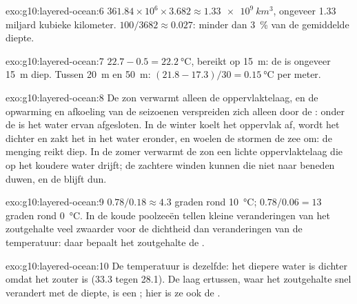 \begin{solution}{exo:g10:layered-ocean:6}
$361.84\times10^6 \times 3.682 \approx \qty{1.33e9}{km^3}$, ongeveer
\num{1.33} miljard kubieke kilometer. $100/3682 \approx 0.027$: minder dan
\qty{3}{\percent} van de gemiddelde diepte.
\end{solution}

\begin{solution}{exo:g10:layered-ocean:7}
$22.7 - 0.5 = \qty{22.2}{\degreeCelsius}$, bereikt op \qty{15}{m}: de  is ongeveer \qty{15}{m} diep. Tussen \qty{20}{m} en \qty{50}{m}:
$(21.8 - 17.3)/30 = \qty{0.15}{\degreeCelsius}$ per meter.
\end{solution}

\begin{solution}{exo:g10:layered-ocean:8}
De zon verwarmt alleen de oppervlaktelaag, en de opwarming en afkoeling van de
seizoenen verspreiden zich alleen door de : onder de  is
het water ervan afgesloten. In de winter koelt het oppervlak af, wordt het
dichter en zakt het in het water eronder, en woelen de stormen de zee om: de
menging reikt diep. In de zomer verwarmt de zon een lichte oppervlaktelaag die op
het koudere water drijft; de zachtere winden kunnen die niet naar beneden duwen,
en de  blijft dun.
\end{solution}

\begin{solution}{exo:g10:layered-ocean:9}
$0.78/0.18 \approx 4.3$ graden rond \qty{10}{\degreeCelsius};
$0.78/0.06 = 13$ graden rond \qty{0}{\degreeCelsius}. In de koude poolzeeën
tellen kleine veranderingen van het zoutgehalte veel zwaarder voor de dichtheid
dan veranderingen van de temperatuur: daar bepaalt het zoutgehalte de
.
\end{solution}

\begin{solution}{exo:g10:layered-ocean:10}
De temperatuur is dezelfde: het diepere water is dichter omdat het zouter is
(33.3 tegen 28.1). De laag ertussen, waar het zoutgehalte snel verandert met de
diepte, is een ; hier is ze ook de .
\end{solution}

